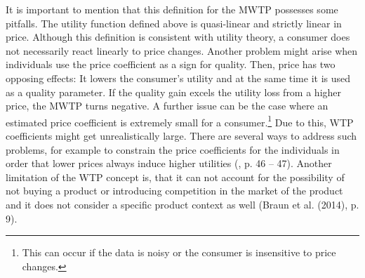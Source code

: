 \documentclass[12pt, abstracton]{article}
\begin{document}
It is important to mention that this definition for the MWTP possesses some pitfalls. The utility function defined above is quasi-linear and strictly linear in price. Although this definition is consistent with utility theory, a consumer does not necessarily react linearly to price changes. Another problem might arise when individuals use the price coefficient as a sign for quality. Then, price has two opposing effects: It lowers the consumer's utility and at the same time it is used as a quality parameter. If the quality gain excels the utility loss from a higher price, the MWTP turns negative.
A further issue can be the case where an estimated price coefficient is extremely small for a consumer.\footnote{This can occur if the data is noisy or the consumer is insensitive to price changes.} Due to this, WTP coefficients might get unrealistically large. There are several ways to address such problems, for example to constrain the price coefficients for the individuals in order that lower prices always induce higher utilities (\cite{Jedidi2009}, p. 46 – 47). Another limitation of the WTP concept is, that it can not account for the possibility of not buying a product or introducing competition in the market of the product and it does not consider a specific product context as well (Braun et al. (2014), p. 9).
\cleardoublepage
\onehalfspacing
\end{document}
